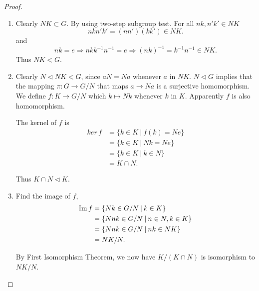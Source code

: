 \begin{proof}
    \begin{enumerate}
        \item Clearly $NK \subset G$. By using two-step subgroup test. For all $nk, n'k' \in NK$
        \[
            nkn'k' = (nn')(kk') \in NK.
        \]
        and 
        \[
            nk = e \Longrightarrow nkk^{-1}n^{-1} = e \Longrightarrow (nk)^{-1} = k^{-1} n^{-1} \in NK.
        \]
        Thus $NK < G$.

        \item Clearly $N \triangleleft NK < G$, since $aN = Na$ whenever $a$ in $NK$. $N \triangleleft G$ 
        implies that the mapping $\pi: G \to G/N$ that maps $a \to Na$ is a surjective homomorphism. We 
        define $f:K \to G/N$ which $k \mapsto Nk$ whenever $k$ in $K$. Apparently $f$ is also 
        homomorphism.

        The kernel of $f$ is
        \begin{align*}
            ker\, f &= \{ k \in K \> | \> f(k) = Ne \}\\
            &= \{ k \in K \> | \> Nk = Ne \}\\
            &= \{ k \in K \> | \> k \in N \}\\
            &= K \cap N.
        \end{align*}

        Thus $K \cap N \triangleleft K$.

        \item Find the image of $f$,
        \begin{align*}
            \operatorname{Im} f &= \{ Nk \in G/N \> | \> k \in K \}\\
            &= \{ Nnk \in G/N \> | \> n \in N, k \in K \}\\
            &= \{ Nnk \in G/N \> | \> nk \in NK \}\\
            &= NK/N.
        \end{align*}

        By First Isomorphism Theorem, we now have $K/(K \cap N)$ is isomorphism to $NK/N$.

        \begin{figure}[ht]
            \centering
        \end{figure}
    \end{enumerate}
\end{proof}

